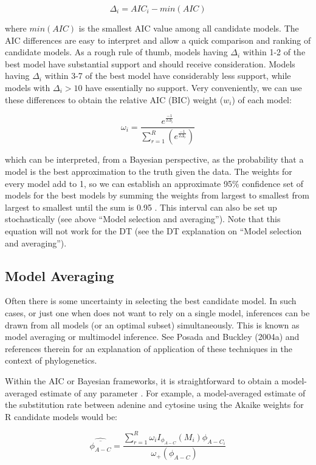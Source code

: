 \documentclass[11pt,twoside,a4paper]{article}
\begin{document}
\[
\Delta_i = AIC_i - min(AIC)
\]

where $min(AIC)$ is the smallest AIC value among all candidate models. The AIC differences are easy to interpret and allow a quick comparison and ranking of candidate models. As a rough rule of thumb, models having $\Delta_i$ within 1-2 of the best model have substantial support and should receive consideration. Models having $\Delta_i$ within 3-7 of the best model have considerably less support, while models with $\Delta_i > 10$ have essentially no support. Very conveniently, we can use these differences to obtain the relative AIC (BIC) weight ($w_i$) of each model:

\[
\omega_i = \frac{e^{\frac{-1}{2 \Delta_i}}}{\sum_{r=1}^R(e^\frac{-1}{2 \Delta_r})}
\]

which can be interpreted, from a Bayesian perspective, as the probability that a model is the best approximation to the truth given the data. The weights for every model add to 1, so we can establish an approximate 95\% confidence set of models for the best models by summing the weights from largest to smallest from largest to smallest until the sum is 0.95 \citep{Burnham-1998, Burnham-2003}. This interval can also be set up stochastically (see above ``Model selection and averaging''). Note that this equation will not work for the DT (see the DT explanation on ``Model selection and averaging'').

\subsection{Model Averaging}

Often there is some uncertainty in selecting the best candidate model. In such cases, or just one when does not want to rely on a single model, inferences can be drawn from all models (or an optimal subset) simultaneously. This is known as model averaging or multimodel inference. See Posada and Buckley (2004a) and references therein for an explanation of application of these techniques in the context of phylogenetics.

Within the AIC or Bayesian frameworks, it is straightforward to obtain a model-averaged estimate of any parameter \citep{Madigan-1994, Raftery-1996, Hoeting-1999, Wasserman-2000, Burnham-2003, Posada-2003}. For example, a model-averaged estimate of the substitution rate between adenine and cytosine using the Akaike weights for R candidate models would be:

\[
\widehat{\overline{\phi_{A-C}}} = \frac{\sum_{r=1}^R \omega_i I_{\phi_{A-C}}(M_i) \phi_{A-C_i}}{\omega_+(\phi_{A-C})}
\]
\end{document}
